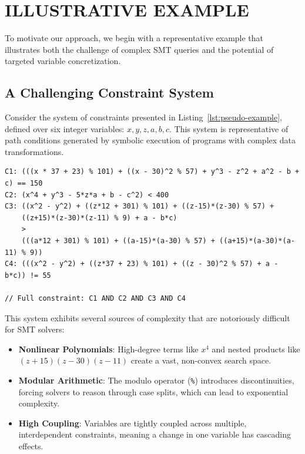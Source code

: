 \section{ILLUSTRATIVE EXAMPLE}\label{sec:example}

To motivate our approach, we begin with a representative example that illustrates both the challenge of complex SMT queries and the potential of targeted variable concretization.

\subsection{A Challenging Constraint System}

Consider the system of constraints presented in Listing~\ref{lst:pseudo-example}, defined over six integer variables: $x, y, z, a, b, c$. This system is representative of path conditions generated by symbolic execution of programs with complex data transformations.

\begin{lstlisting}[language={}, basicstyle=\ttfamily\footnotesize, frame=single, caption={An illustrative system of nonlinear integer constraints.}, label={lst:pseudo-example}]
C1: (((x * 37 + 23) % 101) + ((x - 30)^2 % 57) + y^3 - z^2 + a^2 - b + c) == 150
C2: (x^4 + y^3 - 5*z*a + b - c^2) < 400
C3: ((x^2 - y^2) + ((z*12 + 301) % 101) + ((z-15)*(z-30) % 57) + 
    ((z+15)*(z-30)*(z-11) % 9) + a - b*c) 
    > 
    (((a*12 + 301) % 101) + ((a-15)*(a-30) % 57) + ((a+15)*(a-30)*(a-11) % 9))
C4: (((x^2 - y^2) + ((z*37 + 23) % 101) + ((z - 30)^2 % 57) + a - b*c)) != 55

// Full constraint: C1 AND C2 AND C3 AND C4
\end{lstlisting}

This system exhibits several sources of complexity that are notoriously difficult for SMT solvers:
\begin{itemize}
    \item \textbf{Nonlinear Polynomials}: High-degree terms like $x^4$ and nested products like $(z+15)(z-30)(z-11)$ create a vast, non-convex search space.
    \item \textbf{Modular Arithmetic}: The modulo operator (\texttt{\%}) introduces discontinuities, forcing solvers to reason through case splits, which can lead to exponential complexity.
    \item \textbf{High Coupling}: Variables are tightly coupled across multiple, interdependent constraints, meaning a change in one variable has cascading effects.
\end{itemize}

